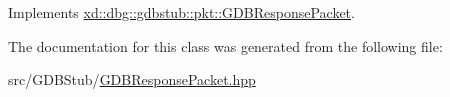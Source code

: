 Implements \mbox{\hyperlink{classxd_1_1dbg_1_1gdbstub_1_1pkt_1_1_g_d_b_response_packet_a2a15795536cd5ff94f0533c406233874}{xd\+::dbg\+::gdbstub\+::pkt\+::\+G\+D\+B\+Response\+Packet}}.



The documentation for this class was generated from the following file\+:\begin{DoxyCompactItemize}
\item 
src/\+G\+D\+B\+Stub/\mbox{\hyperlink{_g_d_b_response_packet_8hpp}{G\+D\+B\+Response\+Packet.\+hpp}}\end{DoxyCompactItemize}
